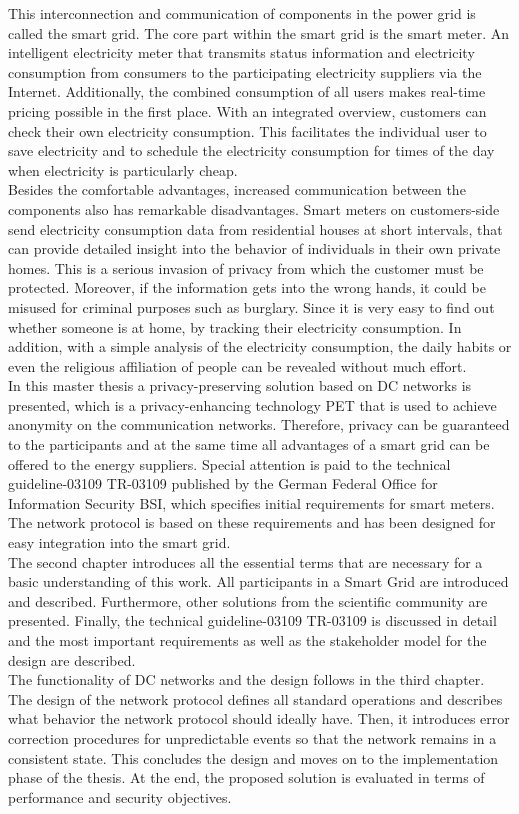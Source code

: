 This interconnection and communication of components in the power grid is called the smart grid. The core part within the smart grid is the smart meter. An intelligent electricity meter that transmits status information and electricity consumption from consumers to the participating electricity suppliers via the Internet. Additionally, the combined consumption of all users makes real-time pricing possible in the first place. With an integrated overview, customers can check their own electricity consumption. This facilitates the individual user to save electricity and to schedule the electricity consumption for times of the day when electricity is particularly cheap.\\ Besides the comfortable advantages, increased communication between the components also has remarkable disadvantages. Smart meters on customers-side send electricity consumption data from residential houses at short intervals, that can provide detailed insight into the behavior of individuals in their own private homes. This is a serious invasion of privacy from which the customer must be protected. Moreover, if the information gets into the wrong hands, it could be misused for criminal purposes such as burglary. Since it is very easy to find out whether someone is at home, by tracking their electricity consumption. In addition, with a simple analysis of the electricity consumption, the daily habits or even the religious affiliation of people can be revealed without much effort.\\ In this master thesis a privacy-preserving solution based on DC networks is presented, which is a privacy-enhancing technology \gls{PET} that is used to achieve anonymity on the communication networks. Therefore, privacy can be guaranteed to the participants and at the same time all advantages of a smart grid can be offered to the energy suppliers. Special attention is paid to the technical guideline-03109 \gls{TR-03109} published by the German Federal Office for Information Security \gls{BSI}, which specifies initial requirements for smart meters. The network protocol is based on these requirements and has been designed for easy integration into the smart grid.\\ The second chapter introduces all the essential terms that are necessary for a basic understanding of this work. All participants in a Smart Grid are introduced and described. Furthermore, other solutions from the scientific community are presented. Finally, the technical guideline-03109 \gls{TR-03109} is discussed in detail and the most important requirements as well as the stakeholder model for the design are described.\\ The functionality of DC networks and the design follows in the third chapter. The design of the network protocol defines all standard operations and describes what behavior the network protocol should ideally have. Then, it introduces error correction procedures for unpredictable events so that the network remains in a consistent state. This concludes the design and moves on to the implementation phase of the thesis. At the end, the proposed solution is evaluated in terms of performance and security objectives.\\
